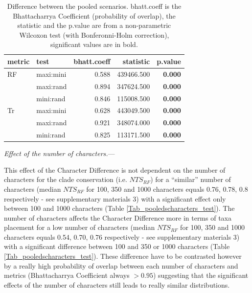 \documentclass[12pt,letterpaper]{article}
\renewcommand{\subsubsection}[1]{%
\vspace{2ex}
\noindent
\textit{#1.}---}
\begin{document}
\begin{table}[ht]
\centering
\begin{tabular}{ll|r|rr}
  \hline
metric & test & bhatt.coeff & statistic & p.value \\ 
  \hline
RF & maxi:mini & 0.588 & 439466.500 & \textbf{0.000} \\ 
   & maxi:rand & 0.894 & 347624.500 & \textbf{0.000} \\ 
   & mini:rand & 0.846 & 115008.500 & \textbf{0.000} \\ 
Tr & maxi:mini & 0.628 & 443049.500 & \textbf{0.000} \\ 
   & maxi:rand & 0.921 & 348074.000 & \textbf{0.000} \\ 
   & mini:rand & 0.825 & 113171.500 & \textbf{0.000} \\ 
   \hline
\end{tabular}
\caption{Difference between the pooled scenarios. bhatt.coeff is the Bhattacharrya Coefficient (probability of overlap), the statistic and the p.value are from a non-parametric Wilcoxon test (with Bonferonni-Holm correction), significant values are in bold.} 
\label{Tab_pooledscenarios_test}
\end{table}

\subsubsection{Effect of the number of characters}

This effect of the Character Difference is not dependent on the number of characters for the clade conservation (i.e. $NTS_{RF}$) for a ``similar'' number of characters (median $NTS_{RF}$ for 100, 350 and 1000 characters equals 0.76, 0.78, 0.8 respectively - see supplementary materials 3) with a significant effect only between 100 and 1000 characters (Table \ref{Tab_pooledscharacters_test}).
The number of characters affects the Character Difference more in terms of taxa placement for a low number of characters (median $NTS_{RF}$ for 100, 350 and 1000 characters equals 0.54, 0.70, 0.76 respectively - see supplementary materials 3) with a significant difference between 100 and 350 or 1000 characters (Table \ref{Tab_pooledscharacters_test}).
These difference have to be contrasted however by a really high probability of overlap between each number of characters and metrics (Bhattacharrya Coefficient always $>0.95$) suggesting that the significant effects of the number of characters still leads to really similar distributions.
\end{document}
